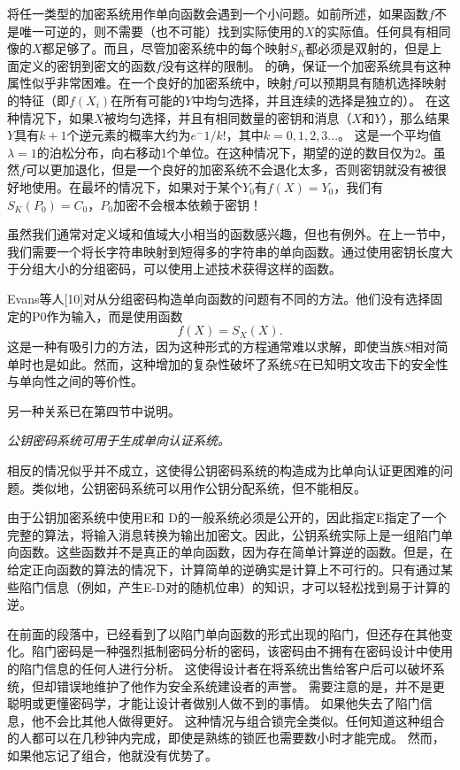 \documentclass[]{article}
\begin{document}
	将任一类型的加密系统用作单向函数会遇到一个小问题。如前所述，如果函数$f$不是唯一可逆的，则不需要（也不可能）找到实际使用的$X$的实际值。任何具有相同像的$X$都足够了。而且，尽管加密系统中的每个映射$S_K$都必须是双射的，但是上面定义的密钥到密文的函数$f$没有这样的限制。
	的确，保证一个加密系统具有这种属性似乎非常困难。在一个良好的加密系统中，映射$f$可以预期具有随机选择映射的特征（即$f(X_i)$在所有可能的$Y$中均匀选择，并且连续的选择是独立的）。
	在这种情况下，如果$X$被均匀选择，并且有相同数量的密钥和消息（$X$和$Y$），那么结果$Y$具有$k+1$个逆元素的概率大约为$e^-1/k!$，其中$k=0,1,2,3...$。
	这是一个平均值$\lambda=1$的泊松分布，向右移动1个单位。在这种情况下，期望的逆的数目仅为2。虽然$f$可以更加退化，但是一个良好的加密系统不会退化太多，否则密钥就没有被很好地使用。在最坏的情况下，如果对于某个$Y_0$有$f(X)=Y_0$，我们有$S_K(P_0)=C_0$，$P_0$加密不会根本依赖于密钥！
	
	
	虽然我们通常对定义域和值域大小相当的函数感兴趣，但也有例外。在上一节中，我们需要一个将长字符串映射到短得多的字符串的单向函数。通过使用密钥长度大于分组大小的分组密码，可以使用上述技术获得这样的函数。
	
	
	Evans等人[10]对从分组密码构造单向函数的问题有不同的方法。他们没有选择固定的P0作为输入，而是使用函数
	\begin{equation}
		f(X)=S_X(X).
	\end{equation}
	这是一种有吸引力的方法，因为这种形式的方程通常难以求解，即使当族$S$相对简单时也是如此。然而，这种增加的复杂性破坏了系统$S$在已知明文攻击下的安全性与单向性之间的等价性。
	
	另一种关系已在第四节中说明。
	
	\vspace{0.5cm}
	\textsl{公钥密码系统可用于生成单向认证系统。}
	\vspace{0.5cm}
	
	相反的情况似乎并不成立，这使得公钥密码系统的构造成为比单向认证更困难的问题。类似地，公钥密码系统可以用作公钥分配系统，但不能相反。
	
	由于公钥加密系统中使用E和 D的一般系统必须是公开的，因此指定E指定了一个完整的算法，将输入消息转换为输出加密文。因此，公钥系统实际上是一组陷门单向函数。这些函数并不是真正的单向函数，因为存在简单计算逆的函数。但是，在给定正向函数的算法的情况下，计算简单的逆确实是计算上不可行的。只有通过某些陷门信息（例如，产生E-D对的随机位串）的知识，才可以轻松找到易于计算的逆。
	
	
	在前面的段落中，已经看到了以陷门单向函数的形式出现的陷门，但还存在其他变化。陷门密码是一种强烈抵制密码分析的密码，该密码由不拥有在密码设计中使用的陷门信息的任何人进行分析。
	这使得设计者在将系统出售给客户后可以破坏系统，但却错误地维护了他作为安全系统建设者的声誉。
	需要注意的是，并不是更聪明或更懂密码学，才能让设计者做别人做不到的事情。
	如果他失去了陷门信息，他不会比其他人做得更好。
	这种情况与组合锁完全类似。任何知道这种组合的人都可以在几秒钟内完成，即使是熟练的锁匠也需要数小时才能完成。
	然而，如果他忘记了组合，他就没有优势了。
	
\end{document}
